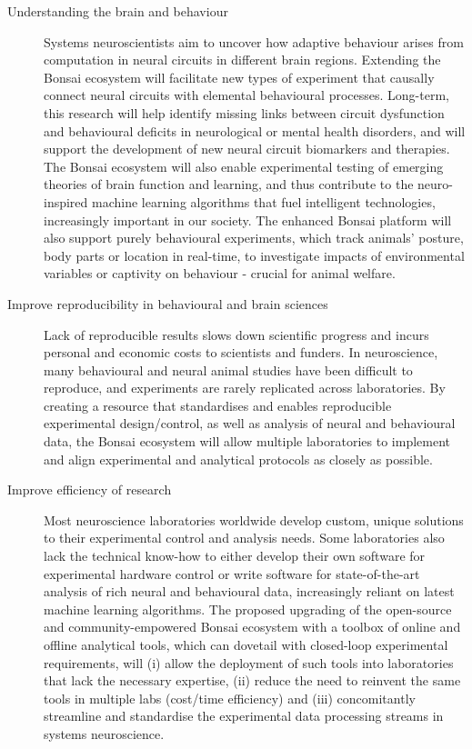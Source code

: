 \documentclass[a4paper,11pt]{article}
\begin{document}
\begin{description}

    \item[Understanding the brain and behaviour] Systems neuroscientists aim to
        uncover how adaptive behaviour arises from computation in neural
        circuits in different brain regions. Extending the Bonsai ecosystem
        will facilitate new types of experiment that causally connect neural
        circuits with elemental behavioural processes. Long-term, this research
        will help identify missing links between circuit dysfunction and
        behavioural deficits in neurological or mental health disorders, and
        will support the development of new neural circuit biomarkers
        and therapies. The Bonsai ecosystem will also enable  experimental
        testing of emerging theories of brain function and learning, and thus
        contribute to the neuro-inspired machine learning algorithms that fuel
        intelligent technologies, increasingly important in our society.  The
        enhanced Bonsai platform will also support purely behavioural
        experiments, which track animals' posture, body parts or location in real-time, to investigate impacts of environmental variables
        or captivity on behaviour - crucial for
        animal welfare.   

    \item[Improve reproducibility in behavioural and brain sciences] Lack of
        reproducible results slows down scientific progress and incurs personal
        and economic costs to scientists and funders.  In neuroscience,  many
        behavioural and neural animal studies have been difficult to
        reproduce, and experiments are rarely replicated across laboratories.
        By creating a resource that standardises and enables reproducible
        experimental design/control, as well as analysis of neural and
        behavioural data, the Bonsai ecosystem will allow multiple laboratories
        to implement and align experimental and analytical protocols as closely
        as possible.

    \item[Improve efficiency of research] Most neuroscience laboratories
        worldwide develop custom, unique solutions to their experimental
        control and analysis needs. Some laboratories also lack the technical
        know-how to either develop their own software for experimental hardware
        control or write software for state-of-the-art analysis of rich
        neural and behavioural data, increasingly reliant on latest machine
        learning algorithms. The proposed upgrading of the open-source and
        community-empowered Bonsai ecosystem with a toolbox of online and
        offline analytical tools, which can dovetail with closed-loop
        experimental requirements, will (i) allow the deployment of such tools
        into laboratories that lack the necessary expertise, (ii) reduce the need to
        reinvent the same tools in multiple labs (cost/time efficiency) and
        (iii) concomitantly streamline and standardise the experimental data
        processing streams in systems neuroscience.

\end{description}
\end{document}
